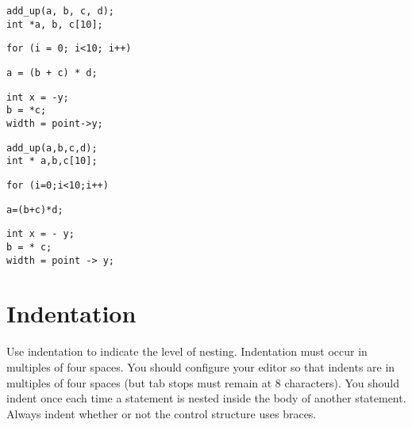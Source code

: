 \documentclass{article}
\begin{document}
\begin{multicols}{2}
\begin{lstlisting}
add_up(a, b, c, d);
int *a, b, c[10];
\end{lstlisting}

\begin{lstlisting}
for (i = 0; i<10; i++)
\end{lstlisting}

\begin{lstlisting}
a = (b + c) * d;
\end{lstlisting}

\begin{lstlisting}
int x = -y;
b = *c;
width = point->y;
\end{lstlisting}
\vfill
\columnbreak

\begin{lstlisting}
add_up(a,b,c,d);
int * a,b,c[10];
\end{lstlisting}

\begin{lstlisting}
for (i=0;i<10;i++)
\end{lstlisting}

\begin{lstlisting}
a=(b+c)*d;
\end{lstlisting}

\begin{lstlisting}
int x = - y;
b = * c;
width = point -> y;
\end{lstlisting}
\end{multicols}

\clearpage
\section{Indentation}
Use indentation to indicate the level of nesting.
Indentation must occur in multiples of four spaces.
You should configure your editor so that indents are in multiples of four spaces (but tab stops must remain at 8 characters).
You should indent once each time a statement is nested inside the body of another statement.
Always indent whether or not the control structure uses braces.
\end{document}
